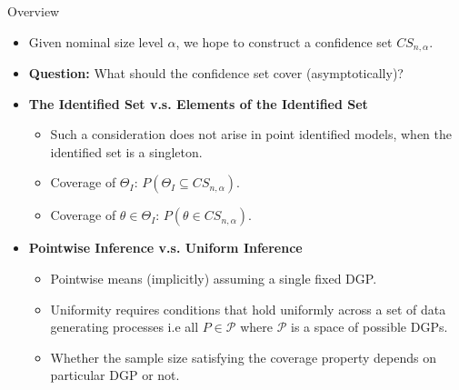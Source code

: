 \documentclass[aspectratio=169]{beamer}  %
\begin{document}
\begin{frame}{Overview}
    \begin{itemize}
        \item Given nominal size level $\alpha$, we hope to construct a confidence set $CS_{n,\alpha}$.
        \item \textbf{Question:} What should the confidence set cover (asymptotically)?
        \item \textbf{The Identified Set v.s.  Elements of the Identified Set}
        \begin{itemize}
            \item Such a consideration does not arise in point identified models, when the identified set is a singleton.
            \item Coverage of $\Theta_I$: $P(\Theta_I\subseteq CS_{n,\alpha})$.
            \item Coverage of $\theta\in\Theta_I$: $P(\theta\in CS_{n,\alpha})$.
        \end{itemize}
        \item \textbf{Pointwise Inference v.s. Uniform Inference}
        \begin{itemize}
            \item Pointwise means (implicitly) assuming a single fixed DGP. 
            \item Uniformity requires conditions that hold uniformly across a set of data generating processes i.e all $P\in\mathscr{P}$ where $\mathscr{P}$ is a space of possible DGPs.
            \item Whether the sample size satisfying the coverage property depends on particular DGP or not.
        \end{itemize}
    \end{itemize}
\end{frame}
\end{document}
